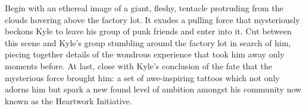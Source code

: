  Begin with an ethereal image of a giant, fleshy, tentacle protruding from the clouds hovering above the factory lot. It exudes a pulling force that mysteriously beckons Kyle to leave his group of punk friends and enter into it. Cut between this scene and Kyle's group stumbling around the factory lot in search of him, piecing together details of the wondrous experience that took him away only moments before. At last, close with Kyle's conclusion of the fate that the mysterious force brought him: a set of awe-inspiring tattoos which not only adorns him but spark a new found level of ambition amongst his community now known as the Heartwork Initiative.